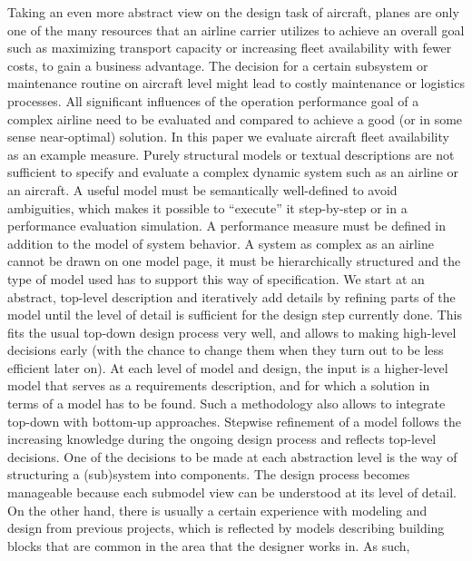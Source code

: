     Taking an even more abstract view on the design task
    of aircraft, planes are only one of the many resources that
    an airline carrier utilizes to achieve an overall goal such as
    maximizing transport capacity or increasing fleet availability
    with fewer costs, to gain a business advantage. The decision
    for a certain subsystem or maintenance routine on aircraft level
    might lead to costly maintenance or logistics processes. All
    significant influences of the operation performance goal of a
    complex airline need to be evaluated and compared to achieve
    a good (or in some sense near-optimal) solution. In this paper
    we evaluate aircraft fleet availability as an example measure.
    Purely structural models or textual descriptions are not
    sufficient to specify and evaluate a complex dynamic system
    such as an airline or an aircraft. A useful model must be
    semantically well-defined to avoid ambiguities, which makes
    it possible to “execute” it step-by-step or in a performance
    evaluation simulation. A performance measure must be defined
    in addition to the model of system behavior.
    A system as complex as an airline cannot be drawn on
    one model page, it must be hierarchically structured and the
    type of model used has to support this way of specification.
    We start at an abstract, top-level description and iteratively
    add details by refining parts of the model until the level of
    detail is sufficient for the design step currently done. This fits
    the usual top-down design process very well, and allows to
    making high-level decisions early (with the chance to change
    them when they turn out to be less efficient later on). At each
    level of model and design, the input is a higher-level model that
    serves as a requirements description, and for which a solution
    in terms of a model has to be found.
    Such a methodology also allows to integrate top-down with
    bottom-up approaches. Stepwise refinement of a model follows
    the increasing knowledge during the ongoing design process
    and reflects top-level decisions. One of the decisions to be
    made at each abstraction level is the way of structuring a
    (sub)system into components. The design process becomes
    manageable because each submodel view can be understood at
    its level of detail. On the other hand, there is usually a certain
    experience with modeling and design from previous projects,
    which is reflected by models describing building blocks that
    are common in the area that the designer works in. As such,
